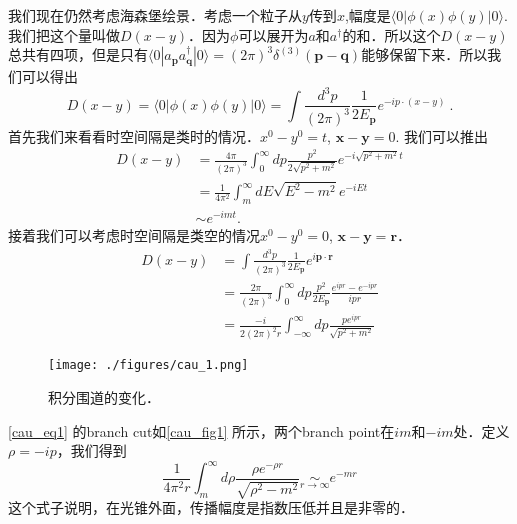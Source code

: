 
我们现在仍然考虑海森堡绘景．考虑一个粒子从$y$传到$x$,幅度是$\langle 0 |\phi(x)\phi(y)| 0 \rangle$.我们把这个量叫做$D(x-y)$．因为$\phi$可以展开为$a$和$a^\dagger$的和．所以这个$D(x-y)$总共有四项，但是只有$\langle 0 | a_{\mathbf p} a^\dagger_{\mathbf q} | 0 \rangle = (2\pi)^3 \delta^{(3)}(\mathbf p - \mathbf q)$能够保留下来．所以我们可以得出
\begin{equation}
D(x-y)=\langle 0|\phi(x) \phi(y)| 0\rangle=\int \frac{d^{3} p}{(2 \pi)^{3}} \frac{1}{2 E_{\mathbf{p}}} e^{-i p \cdot(x-y)}~.
\end{equation}
首先我们来看看时空间隔是类时的情况．$x^0 - y^0 = t$, $\mathbf x - \mathbf y = 0$. 我们可以推出
\begin{equation}
\begin{aligned}
D(x-y) &=\frac{4 \pi}{(2 \pi)^{3}} \int_{0}^{\infty} d p \frac{p^{2}}{2 \sqrt{p^{2}+m^{2}}} e^{-i \sqrt{p^{2}+m^{2}} t} \\
&=\frac{1}{4 \pi^{2}} \int_{m}^{\infty} d E \sqrt{E^{2}-m^{2}} e^{-i E t} \\
& \sim e^{-i m t} .
\end{aligned}
\end{equation}
接着我们可以考虑时空间隔是类空的情况$x^0 - y^0 = 0$, $\mathbf x - \mathbf y = \mathbf r$．
\begin{equation}\label{cau_eq1}
\begin{aligned}
D(x-y) &=\int \frac{d^{3} p}{(2 \pi)^{3}} \frac{1}{2 E_{\mathbf{p}}} e^{i \mathbf{p} \cdot \mathbf{r}} \\
&=\frac{2 \pi}{(2 \pi)^{3}} \int_{0}^{\infty} d p \frac{p^{2}}{2 E_{\mathbf{p}}} \frac{e^{i p r}-e^{-i p r}}{i p r} \\
&=\frac{-i}{2(2 \pi)^{2} r} \int_{-\infty}^{\infty} d p \frac{p e^{i p r}}{\sqrt{p^{2}+m^{2}}}
\end{aligned}
\end{equation}
\begin{figure}[ht]
\centering
\texttt{[image: ./figures/cau\_1.png]}
\caption{积分围道的变化．} \label{cau_fig1}
\end{figure}
\autoref{cau_eq1} 的branch cut如\autoref{cau_fig1} 所示，两个branch point在$im$和$-im$处．定义$\rho = -ip$，我们得到
\begin{equation}
\frac{1}{4 \pi^{2} r} \int_{m}^{\infty} d \rho \frac{\rho e^{-\rho r}}{\sqrt{\rho^{2}-m^{2}}} \underset{r \rightarrow \infty}{\sim} e^{-m r}
\end{equation}
这个式子说明，在光锥外面，传播幅度是指数压低并且是非零的．

